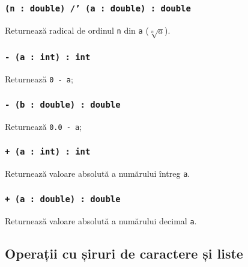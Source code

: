 \subsubsection{\texttt{(n : double) /' (a : double) : double}}

Returnează radical de ordinul \texttt{n} din \texttt{a} ($\sqrt[n]{a}$).


\subsubsection{\texttt{- (a : int) : int}}

Returnează \texttt{0 - a};

\subsubsection{\texttt{- (b : double) : double}}

Returnează \texttt{0.0 - a};

\subsubsection{\texttt{+ (a : int) : int}}

Returnează valoare absolută a numărului întreg \texttt{a}.

\subsubsection{\texttt{+ (a : double) : double}}

Returnează valoare absolută a numărului decimal \texttt{a}.

\subsection{Operații cu șiruri de caractere și liste}


